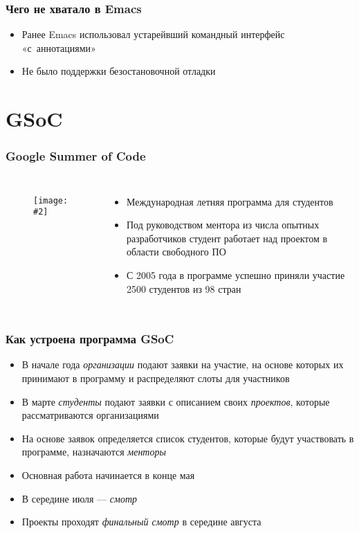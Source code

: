 \documentclass[onlymath]{beamer}
\newcommand\neword\emph
\newcommand{\cenfig}[2]{\begin{figure}\centering\texttt{[image: \#2]}
  \end{figure}}
\begin{document}
\begin{frame}
  \frametitle{Чего не хватало в Emacs}
  \begin{itemize}
  \item Ранее Emacs использовал устарейвший командный интерфейс
    «с аннотациями»
  \item Не было поддержки безостановочной отладки
  \end{itemize}
\end{frame}

\section{GSoC}
\begin{frame}
  \frametitle{Google Summer of Code}
  \begin{columns}
    \cenfig{0.1}{google.jpg}
  \begin{itemize}
  \item Международная летняя программа для студентов
  \item Под руководством ментора из числа опытных разработчиков
    студент работает над проектом в области свободного \textsc{ПО}
  \item С 2005 года в программе успешно приняли участие 2500 студентов
    из 98 стран
  \end{itemize}
\end{columns}
\end{frame}

\begin{frame}
  \frametitle{Как устроена программа GSoC}
  \begin{itemize}
  \item В начале года \neword{организации} подают заявки на участие,
    на основе которых их принимают в программу и распределяют слоты
    для участников
  \item В марте \neword{студенты} подают заявки с описанием своих
    \neword{проектов}, которые рассматриваются организациями
  \item На основе заявок определяется список студентов, которые будут
    участвовать в программе, назначаются \neword{менторы}
  \item Основная работа начинается в конце мая
  \item В середине июля — \neword{смотр}
  \item Проекты проходят \neword{финальный смотр} в середине августа
  \end{itemize}
\end{frame}
\end{document}
